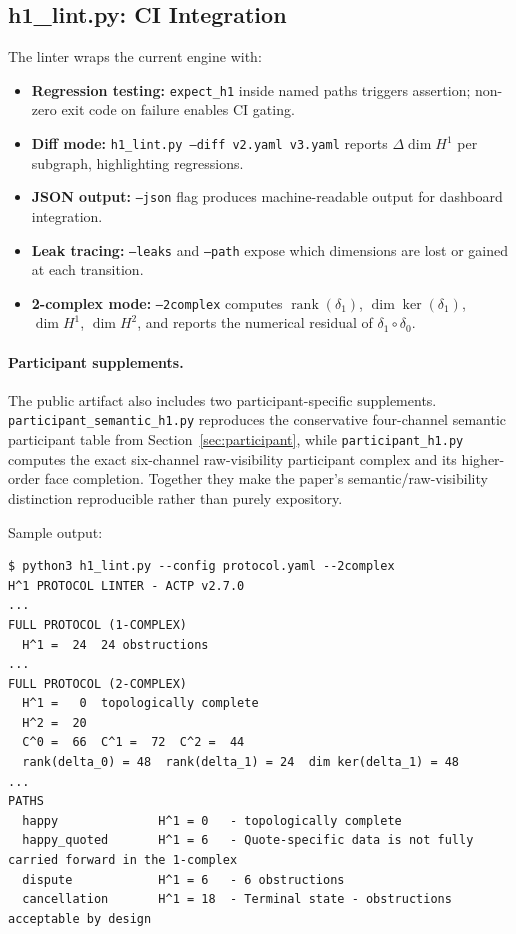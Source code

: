 \documentclass[11pt]{article}
\theoremstyle{plain}
\theoremstyle{definition}
\newcommand{\Hone}{H^{1}}
\newcommand{\Htwo}{H^{2}}
\newcommand{\deltazero}{\delta_{0}}
\newcommand{\deltaone}{\delta_{1}}
\newcommand{\rank}{\operatorname{rank}}
\newcommand{\dimn}{\operatorname{dim}}
\begin{document}
\subsection{h1\_lint.py: CI Integration}

The linter wraps the current engine with:
\begin{itemize}
  \item \textbf{Regression testing:} \texttt{expect\_h1} inside named paths
        triggers assertion; non-zero exit code on failure enables CI
        gating.
  \item \textbf{Diff mode:} \texttt{h1\_lint.py --diff v2.yaml v3.yaml}
        reports $\Delta\dimn\Hone$ per subgraph, highlighting regressions.
  \item \textbf{JSON output:} \texttt{--json} flag produces machine-readable
        output for dashboard integration.
  \item \textbf{Leak tracing:} \texttt{--leaks} and \texttt{--path} expose
        which dimensions are lost or gained at each transition.
  \item \textbf{2-complex mode:} \texttt{--2complex} computes
        $\rank(\deltaone)$, $\dimn\ker(\deltaone)$, $\dimn\Hone$,
        $\dimn\Htwo$, and reports the numerical residual of
        $\deltaone \circ \deltazero$.
\end{itemize}

\paragraph{Participant supplements.}
The public artifact also includes two participant-specific supplements.
\texttt{participant\_semantic\_h1.py} reproduces the conservative
four-channel semantic participant table from Section~\ref{sec:participant},
while \texttt{participant\_h1.py} computes the exact six-channel
raw-visibility participant complex and its higher-order face completion.
Together they make the paper's semantic/raw-visibility distinction
reproducible rather than purely expository.

Sample output:
\begin{lstlisting}[caption={Current public linter output for ACTP v2.7.  The path name \texttt{happy\_quoted} corresponds to the Quote/commit comparison subgraph in Table~\ref{tab:h1_1complex}.}]
$ python3 h1_lint.py --config protocol.yaml --2complex
H^1 PROTOCOL LINTER - ACTP v2.7.0
...
FULL PROTOCOL (1-COMPLEX)
  H^1 =  24  24 obstructions
...
FULL PROTOCOL (2-COMPLEX)
  H^1 =   0  topologically complete
  H^2 =  20
  C^0 =  66  C^1 =  72  C^2 =  44
  rank(delta_0) = 48  rank(delta_1) = 24  dim ker(delta_1) = 48
...
PATHS
  happy              H^1 = 0   - topologically complete
  happy_quoted       H^1 = 6   - Quote-specific data is not fully carried forward in the 1-complex
  dispute            H^1 = 6   - 6 obstructions
  cancellation       H^1 = 18  - Terminal state - obstructions acceptable by design
\end{lstlisting}
\end{document}
